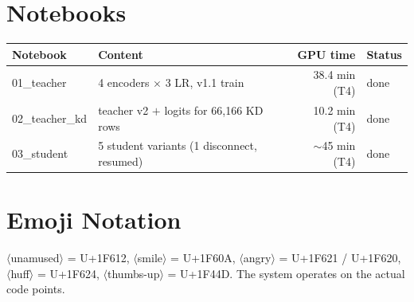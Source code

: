 \documentclass[11pt,a4paper]{article}
\theoremstyle{remark}
\newcommand{\emo}[1]{\textsf{\small$\langle$#1$\rangle$}}
\begin{document}
\section{Notebooks}
\begin{table}[h]
\centering\small
\begin{tabular}{@{}l l r l@{}}
\toprule
Notebook & Content & GPU time & Status \\
\midrule
01\_teacher & 4 encoders $\times$ 3 LR, v1.1 train & 38.4 min (T4) & done \\
02\_teacher\_kd & teacher v2 $+$ logits for 66{,}166 KD rows & 10.2 min (T4) & done \\
03\_student & 5 student variants (1 disconnect, resumed) & $\sim$45 min (T4) & done \\
\bottomrule
\end{tabular}
\end{table}

\section{Emoji Notation}
\emo{unamused} = U+1F612, \emo{smile} = U+1F60A, \emo{angry} = U+1F621 / U+1F620, \emo{huff} = U+1F624, \emo{thumbs-up} = U+1F44D. The system operates on the actual code points.
\end{document}
